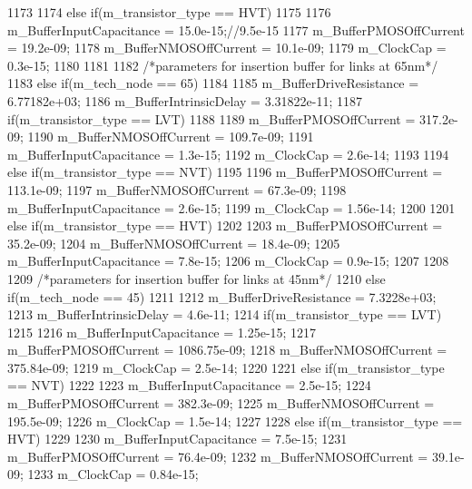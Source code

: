 \begin{DoxyCode}
{{{1173         }
1174         else if(m_transistor_type == HVT)
1175         {
1176             m_BufferInputCapacitance    =  15.0e-15;//9.5e-15
1177             m_BufferPMOSOffCurrent      =  19.2e-09;
1178             m_BufferNMOSOffCurrent      =  10.1e-09; 
1179             m_ClockCap                  =  0.3e-15;
1180         }
1181     }
1182     /*parameters for insertion buffer for links at 65nm*/
1183     else if(m_tech_node == 65)
1184     {
1185         m_BufferDriveResistance     = 6.77182e+03;
1186         m_BufferIntrinsicDelay      = 3.31822e-11;
1187         if(m_transistor_type == LVT)
1188         {
1189             m_BufferPMOSOffCurrent          = 317.2e-09;
1190             m_BufferNMOSOffCurrent          = 109.7e-09;
1191             m_BufferInputCapacitance    = 1.3e-15;
1192             m_ClockCap                  = 2.6e-14;
1193         }
1194         else if(m_transistor_type == NVT)
1195         {
1196             m_BufferPMOSOffCurrent      = 113.1e-09;
1197             m_BufferNMOSOffCurrent      = 67.3e-09;
1198             m_BufferInputCapacitance    = 2.6e-15;
1199             m_ClockCap                  = 1.56e-14;
1200         }
1201         else if(m_transistor_type == HVT)
1202         {
1203             m_BufferPMOSOffCurrent      = 35.2e-09;
1204             m_BufferNMOSOffCurrent      = 18.4e-09;
1205             m_BufferInputCapacitance    = 7.8e-15;
1206             m_ClockCap                  = 0.9e-15;
1207         }
1208     }
1209     /*parameters for insertion buffer for links at 45nm*/
1210     else if(m_tech_node == 45)
1211     {
1212         m_BufferDriveResistance      = 7.3228e+03;
1213         m_BufferIntrinsicDelay       = 4.6e-11;
1214         if(m_transistor_type == LVT)
1215         {
1216             m_BufferInputCapacitance     = 1.25e-15;
1217             m_BufferPMOSOffCurrent       = 1086.75e-09;
1218             m_BufferNMOSOffCurrent       = 375.84e-09;
1219             m_ClockCap                   = 2.5e-14;
1220         }
1221         else if(m_transistor_type == NVT)
1222         {
1223             m_BufferInputCapacitance     = 2.5e-15;     
1224             m_BufferPMOSOffCurrent       = 382.3e-09;
1225             m_BufferNMOSOffCurrent       = 195.5e-09;
1226             m_ClockCap                   = 1.5e-14;
1227         }
1228         else if(m_transistor_type == HVT)
1229         {
1230             m_BufferInputCapacitance     = 7.5e-15;
1231             m_BufferPMOSOffCurrent       = 76.4e-09;
1232             m_BufferNMOSOffCurrent       = 39.1e-09;
1233             m_ClockCap                   = 0.84e-15;
}}}
\end{DoxyCode}
